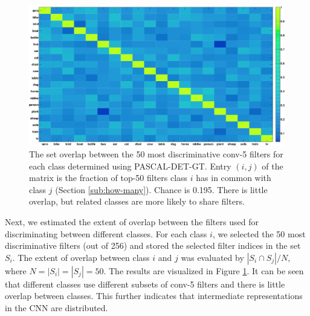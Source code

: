 \begin{figure}[t!]
\centering
\includegraphics[width=1.0\linewidth]{images/ftNet.png}
\caption{The set overlap between the 50 most discriminative conv-5 filters for each class determined using PASCAL-DET-GT.
Entry $(i, j)$ of the matrix is the fraction of top-50 filters class $i$ has in common with class $j$ (Section \ref{sub:how-many}). Chance is 0.195. There is little overlap, but related classes are more likely to share filters.}
\label{fig:overlap}
\end{figure}

Next, we estimated the extent of overlap between the filters used for discriminating between different classes.
For each class $i$, we selected the 50 most discriminative filters (out of 256) and stored the selected filter indices in the set $S_i$.
The extent of overlap between class $i$ and $j$ was evaluated by $|S_i \cap S_j| / N$,
where $N = |S_i| = |S_j| = 50$. The results are visualized in Figure \ref{fig:overlap}. It can be seen that different classes use different subsets of conv-5 filters and there is little overlap between classes. This further indicates that intermediate representations in the CNN are distributed.
